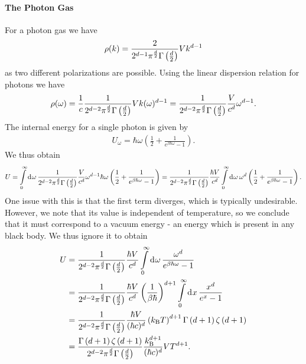 \paragraph{The Photon Gas}
For a photon gas we have
\begin{align*}
	\rho(k) = \frac{2}{2^{d - 1}\pi^{\frac{d}{2}}\Gamma\left(\frac{d}{2}\right)}Vk^{d - 1}
\end{align*}
as two different polarizations are possible. Using the linear dispersion relation for photons we have
\begin{align*}
	\rho(\omega) = \frac{1}{c}\frac{1}{2^{d - 2}\pi^{\frac{d}{2}}\Gamma\left(\frac{d}{2}\right)}Vk(\omega)^{d - 1} = \frac{1}{2^{d - 2}\pi^{\frac{d}{2}}\Gamma\left(\frac{d}{2}\right)}\frac{V}{c^{d}}\omega^{d - 1}.
\end{align*}
The internal energy for a single photon is given by
\begin{align*}
	U_{\omega} = \hbar\omega\left(\frac{1}{2} + \frac{1}{e^{\beta\hbar\omega} - 1}\right).
\end{align*}
We thus obtain
\begin{align*}
	U = \int\limits_{0}^{\infty}\dd[]{\omega}\frac{1}{2^{d - 2}\pi^{\frac{d}{2}}\Gamma\left(\frac{d}{2}\right)}\frac{V}{c^{d}}\omega^{d - 1}\hbar\omega\left(\frac{1}{2} + \frac{1}{e^{\beta\hbar\omega} - 1}\right) = \frac{1}{2^{d - 2}\pi^{\frac{d}{2}}\Gamma\left(\frac{d}{2}\right)}\frac{\hbar V}{c^{d}}\int\limits_{0}^{\infty}\dd[]{\omega}\omega^{d}\left(\frac{1}{2} + \frac{1}{e^{\beta\hbar\omega} - 1}\right).
\end{align*}
One issue with this is that the first term diverges, which is typically undesirable. However, we note that its value is independent of temperature, so we conclude that it must correspond to a vacuum energy - an energy which is present in any black body. We thus ignore it to obtain
\begin{align*}
	U &= \frac{1}{2^{d - 2}\pi^{\frac{d}{2}}\Gamma\left(\frac{d}{2}\right)}\frac{\hbar V}{c^{d}}\int\limits_{0}^{\infty}\dd[]{\omega}\frac{\omega^{d}}{e^{\beta\hbar\omega} - 1} \\
      &= \frac{1}{2^{d - 2}\pi^{\frac{d}{2}}\Gamma\left(\frac{d}{2}\right)}\frac{\hbar V}{c^{d}}\left(\frac{1}{\beta\hbar}\right)^{d + 1}\int\limits_{0}^{\infty}\dd[]{x}\frac{x^{d}}{e^{x} - 1} \\
      &= \frac{1}{2^{d - 2}\pi^{\frac{d}{2}}\Gamma\left(\frac{d}{2}\right)}\frac{\hbar V}{(\hbar c)^{d}}\left(k_{\text{B}} T\right)^{d + 1}\Gamma\left(d + 1\right)\zeta\left(d + 1\right) \\
      &= \frac{\Gamma\left(d + 1\right)\zeta\left(d + 1\right)}{2^{d - 2}\pi^{\frac{d}{2}}\Gamma\left(\frac{d}{2}\right)}\frac{k_{\text{B}}^{d + 1}}{(\hbar c)^{d}}VT^{d + 1}.
\end{align*}
